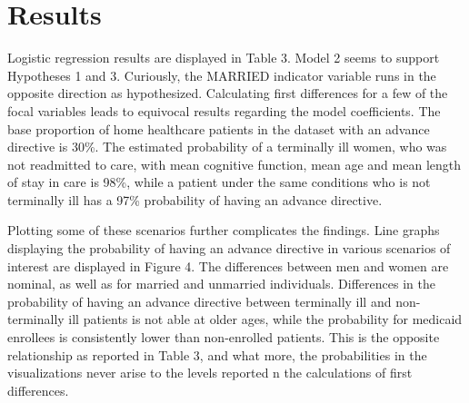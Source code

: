 \documentclass{article}
\begin{document}
\section{Results}

Logistic regression results are displayed in Table 3. Model 2 seems to support Hypotheses 1 and 3. Curiously, the MARRIED indicator variable runs in the opposite direction as hypothesized. Calculating first differences for a few of the focal variables leads to equivocal results regarding the model coefficients. The base proportion of home healthcare patients in the dataset with an advance directive is 30\%. The estimated probability of a terminally ill women, who was not readmitted to care, with mean cognitive function, mean age and mean length of stay in care is 98\%, while a patient under the same conditions who is not terminally ill has a 97\% probability of having an advance directive. 

Plotting some of these scenarios further complicates the findings. Line graphs displaying the probability of having an advance directive in various scenarios of interest are displayed in Figure 4. The differences between men and women are nominal, as well as for married and unmarried individuals. Differences in the probability of having an advance directive between terminally ill and non-terminally ill patients is not able at older ages, while the probability for medicaid enrollees is consistently lower than non-enrolled patients. This is the opposite relationship as reported in Table 3, and what more, the probabilities in the visualizations never arise to the levels reported n the calculations of first differences. 
\end{document}
